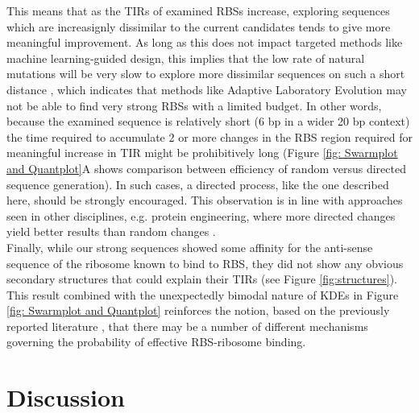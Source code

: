\documentclass{scrartcl}[2013/05/29]%
\begin{document}
This means that as the TIRs of examined RBSs increase, exploring sequences which are increasignly dissimilar to the current candidates tends to give more meaningful improvement.
As long as this does not impact targeted methods like machine learning-guided design, this implies that the low rate of natural mutations will be very slow to explore more dissimilar sequences on such a short distance \cite{Lee2012}, which indicates that methods like Adaptive Laboratory Evolution may not be able to find very strong RBSs with a limited budget.
In other words, because the examined sequence is relatively short (6 bp in a wider 20 bp context) the time required to accumulate 2 or more changes in the RBS region required for meaningful increase in TIR might be prohibitively long (Figure \ref{fig: Swarmplot and Quantplot}A shows comparison between efficiency of random versus directed sequence generation).
In such cases, a directed process, like the one described here, should be strongly encouraged.
This observation is in line with approaches seen in other disciplines, e.g. protein engineering, where more directed changes yield better results than random changes \cite{Jackel2008}.\\

Finally, while our strong sequences showed some affinity for the anti-sense sequence of the ribosome known to bind to RBS, they did not show any obvious secondary structures that could explain their TIRs (see Figure \ref{fig:structures}).
This result combined with the unexpectedly bimodal nature of KDEs in Figure \ref{fig: Swarmplot and Quantplot} reinforces the notion, based on the previously reported literature \cite{Saito2020,EspahBorujeni2016}, that there may be a number of different mechanisms governing the probability of effective RBS-ribosome binding.\\



\section{Discussion}
\end{document}
